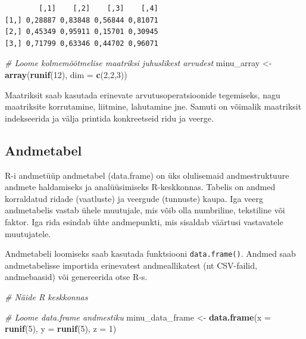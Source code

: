 \documentclass[
]{book}
\newenvironment{Shaded}{\begin{snugshade}}{\end{snugshade}}
\newcommand{\AttributeTok}[1]{\textcolor[rgb]{0.13,0.29,0.53}{#1}}
\newcommand{\CommentTok}[1]{\textcolor[rgb]{0.56,0.35,0.01}{\textit{#1}}}
\newcommand{\DecValTok}[1]{\textcolor[rgb]{0.00,0.00,0.81}{#1}}
\newcommand{\FunctionTok}[1]{\textcolor[rgb]{0.13,0.29,0.53}{\textbf{#1}}}
\newcommand{\NormalTok}[1]{#1}
\newcommand{\OtherTok}[1]{\textcolor[rgb]{0.56,0.35,0.01}{#1}}
\renewenvironment{Shaded} {\begin{snugshade}\footnotesize} {\end{snugshade}}
\begin{document}
\begin{verbatim}
        [,1]    [,2]    [,3]    [,4]
[1,] 0,28887 0,83848 0,56844 0,81071
[2,] 0,45349 0,95911 0,15701 0,30945
[3,] 0,71799 0,63346 0,44702 0,96071
\end{verbatim}

\begin{Shaded}
\begin{Highlighting}[]
\CommentTok{\# Loome kolmemõõtmelise maatriksi juhuslikest arvudest}
\NormalTok{minu\_array }\OtherTok{\textless{}{-}} \FunctionTok{array}\NormalTok{(}\FunctionTok{runif}\NormalTok{(}\DecValTok{12}\NormalTok{), }\AttributeTok{dim =} \FunctionTok{c}\NormalTok{(}\DecValTok{2}\NormalTok{,}\DecValTok{2}\NormalTok{,}\DecValTok{3}\NormalTok{))}
\end{Highlighting}
\end{Shaded}

Maatriksit saab kasutada erinevate arvutusoperatsioonide tegemiseks, nagu maatriksite korrutamine, liitmine, lahutamine jne. Samuti on võimalik maatriksit indekseerida ja välja printida konkreetseid ridu ja veerge.

\subsection{Andmetabel}\label{andmetabel}

R-i andmetüüp andmetabel (data.frame) on üks olulisemaid andmestruktuure andmete haldamiseks ja analüüsimiseks R-keskkonnas. Tabelis on andmed korraldatud ridade (vaatluste) ja veergude (tunnuste) kaupa. Iga veerg andmetabelis vastab ühele muutujale, mis võib olla numbriline, tekstiline või faktor. Iga rida esindab ühte andmepunkti, mis sisaldab väärtusi vastavatele muutujatele.

Andmetabeli loomiseks saab kasutada funktsiooni \texttt{data.frame()}. Andmed saab andmetabelisse importida erinevatest andmeallikatest (nt CSV-failid, andmebaasid) või genereerida otse R-s.

\begin{Shaded}
\begin{Highlighting}[]
\CommentTok{\# Näide R keskkonnas}

\CommentTok{\# Loome data.frame andmestiku}
\NormalTok{minu\_data\_frame }\OtherTok{\textless{}{-}} \FunctionTok{data.frame}\NormalTok{(}\AttributeTok{x =} \FunctionTok{runif}\NormalTok{(}\DecValTok{5}\NormalTok{), }\AttributeTok{y =} \FunctionTok{runif}\NormalTok{(}\DecValTok{5}\NormalTok{), }\AttributeTok{z =} \DecValTok{1}\NormalTok{)}
\end{Highlighting}
\end{Shaded}
\end{document}
